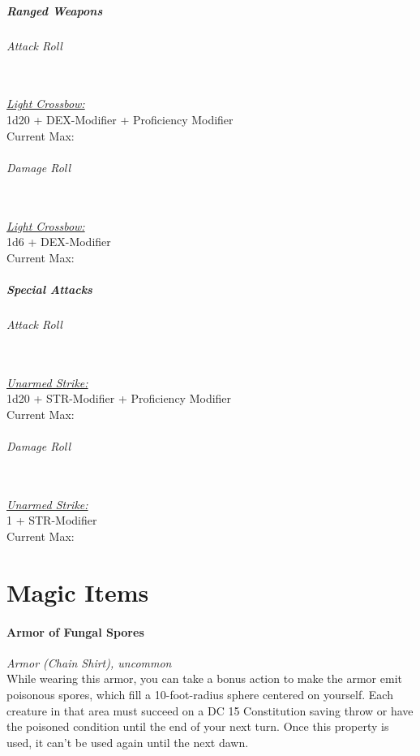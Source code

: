 \documentclass[letterpaper,openany,oneside,twocolumn]{book}
\newcommand{\PATH}{../../../}
\begin{document}
\subsubsection*{Ranged Weapons}
\paragraph*{Attack Roll}\hfill\\
\underline{\textit{Light Crossbow:}}\\
1d20 + DEX-Modifier + Proficiency Modifier\\
\indent Current Max: 
\paragraph*{Damage Roll}\hfill\\
\underline{\textit{Light Crossbow:}}\\
1d6 + DEX-Modifier\\
\indent Current Max: 
\subsubsection*{Special Attacks}
\paragraph*{Attack Roll}\hfill\\
\underline{\textit{Unarmed Strike:}}\\
1d20 + STR-Modifier + Proficiency Modifier\\
\indent Current Max: 
\paragraph*{Damage Roll}\hfill\\
\underline{\textit{Unarmed Strike:}}\\
1 + STR-Modifier\\
\indent Current Max: 

\part*{Magic Items}



\newpage
\subsection*{Armor of Fungal Spores}
\textit{Armor (Chain Shirt), uncommon}\\
While wearing this armor, you can take a bonus action to make the armor emit poisonous spores, which fill a 10-foot-radius sphere centered on yourself. Each creature in that area must succeed on a DC 15 Constitution saving throw or have the poisoned condition until the end of your next turn. Once this property is used, it can't be used again until the next dawn.
\end{document}
